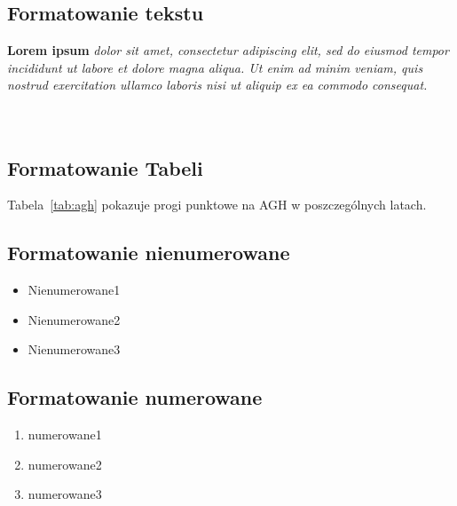 \subsection{Formatowanie tekstu}
\textbf{Lorem ipsum} \textit{dolor sit amet, consectetur adipiscing elit, sed do eiusmod tempor incididunt ut labore et dolore magna aliqua. Ut enim ad minim veniam, quis nostrud exercitation ullamco laboris nisi ut aliquip ex ea commodo consequat.}
\\
\\
\\
\subsection{Formatowanie Tabeli}
Tabela~\ref{tab:agh} pokazuje progi punktowe na AGH w poszczególnych latach.



\subsection{Formatowanie nienumerowane}

\begin{itemize}
  \item Nienumerowane1
  \item Nienumerowane2
  \item Nienumerowane3
\end{itemize}

\subsection{Formatowanie numerowane}
\begin{enumerate}
    \item numerowane1
    \item numerowane2
    \item numerowane3
\end{enumerate}
